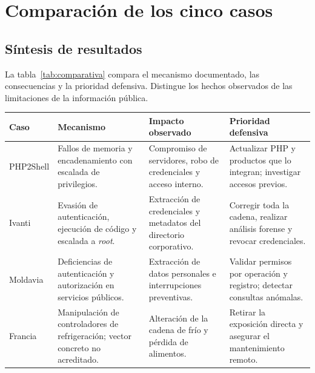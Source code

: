\chapter{Comparación de los cinco casos}
\label{chap:comparativa}

\section{Síntesis de resultados}
La tabla~\ref{tab:comparativa} compara el mecanismo
documentado, las consecuencias y la prioridad defensiva.
Distingue los hechos observados de las limitaciones
de la información pública.

\begin{table}[htbp]
    \centering
    \small
    \renewcommand{\arraystretch}{1.15}
    \begin{tabularx}{\textwidth}{
        @{}p{2.1cm}XXX@{}
        }
        \toprule
        Caso                                  & Mecanismo & Impacto observado & Prioridad defensiva \\
        \midrule
        PHP2Shell                             &
        Fallos de memoria y encadenamiento con escalada
        de privilegios.                       &
        Compromiso de servidores, robo de credenciales
        y acceso interno.                     &
        Actualizar PHP y productos que lo integran;
        investigar accesos previos.                                                                 \\

        Ivanti                                &
        Evasión de autenticación, ejecución de código
        y escalada a \textit{root}.           &
        Extracción de credenciales y metadatos
        del directorio corporativo.           &
        Corregir toda la cadena, realizar análisis
        forense y revocar credenciales.                                                             \\

        Moldavia                              &
        Deficiencias de autenticación y autorización
        en servicios públicos.                &
        Extracción de datos personales e interrupciones
        preventivas.                          &
        Validar permisos por operación y registro;
        detectar consultas anómalas.                                                                \\

        Francia                               &
        Manipulación de controladores de refrigeración;
        vector concreto no acreditado.        &
        Alteración de la cadena de frío
        y pérdida de alimentos.               &
        Retirar la exposición directa y asegurar
        el mantenimiento remoto.                                                                    \\


\end{tabularx}
\end{table}
